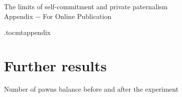 \documentclass[oneside,11pt]{article}
\begin{document}

\setcounter{table}{0}
\setcounter{figure}{0}
\setcounter{section}{0}


\begin{center}
	\LARGE The limits of self-commitment and private paternalism \\[0.5em]
	\Large{Appendix $-$ For Online Publication} \\[1em]
	\large \author{Isaac Meza \and Joyce Sadka \and Enrique Seira}
\end{center}

\appendix
{}
\renewcommand\thefigure{OA-\arabic{figure}}
\renewcommand\thetable{OA-\arabic{table}}
\renewcommand*{\thepage}{OA - \arabic{page}}
\renewcommand\thesection{Appendix \Alph{section}.}
\renewcommand\thesubsection{\Alph{section}.\arabic{subsection}}

\renewcommand\cftsecdotsep{\cftdotsep}
\renewcommand\cftsubsecdotsep{\cftnodots}
\renewcommand{\cftsecnumwidth}{6em}
 \renewcommand{\cftpnumalign}{r}


\renewcommand{\cftsecleader}{\cftdotfill{\cftsecdotsep}\hspace{1.8em}}

\etocdepthtag.toc{mtappendix}


\begingroup
\let\clearpage\relax
\tableofcontents
\endgroup


\newpage



\section{ Further results}
\vspace{.2in}


\begin{table}[H]
\caption{Number of pawns balance before and after the experiment}
\label{num_pawns_bal}
\begin{center}
\scriptsize{}
\end{center}
 \scriptsize 
\end{table}
\end{document}
